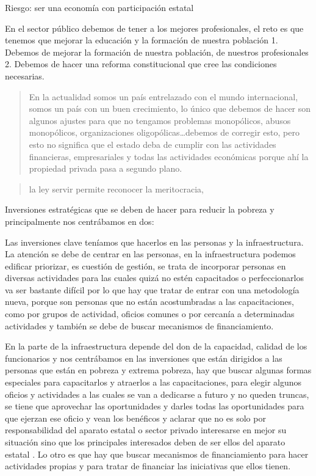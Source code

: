 \documentclass[
  a4paper,
]{article}
\begin{document}
Riesgo: ser una economía con participación estatal

En el sector público debemos de tener a los mejores profesionales, el
reto es que tenemos que mejorar la educación y la formación de nuestra
población 1. Debemos de mejorar la formación de nuestra población, de
nuestros profesionales 2. Debemos de hacer una reforma constitucional
que cree las condiciones necesarias.

\begin{quote}
En la actualidad somos un país entrelazado con el mundo internacional,
somos un país con un buen crecimiento, lo único que debemos de hacer son
algunos ajustes para que no tengamos problemas monopólicos, abusos
monopólicos, organizaciones oligopólicas\ldots debemos de corregir esto,
pero esto no significa que el estado deba de cumplir con las actividades
financieras, empresariales y todas las actividades económicas porque ahí
la propiedad privada pasa a segundo plano.
\end{quote}

\begin{quote}
la ley servir permite reconocer la meritocracia,
\end{quote}

Inversiones estratégicas que se deben de hacer para reducir la pobreza y
principalmente nos centrábamos en dos:

Las inversiones clave teníamos que hacerlos en las personas y la
infraestructura. La atención se debe de centrar en las personas, en la
infraestructura podemos edificar priorizar, es cuestión de gestión, se
trata de incorporar personas en diversas actividades para las cuales
quizá no estén capacitados o perfeccionarlos va ser bastante difícil por
lo que hay que tratar de entrar con una metodología nueva, porque son
personas que no están acostumbradas a las capacitaciones, como por
grupos de actividad, oficios comunes o por cercanía a determinadas
actividades y también se debe de buscar mecanismos de financiamiento.

En la parte de la infraestructura depende del don de la capacidad,
calidad de los funcionarios y nos centrábamos en las inversiones que
están dirigidos a las personas que están en pobreza y extrema pobreza,
hay que buscar algunas formas especiales para capacitarlos y atraerlos a
las capacitaciones, para elegir algunos oficios y actividades a las
cuales se van a dedicarse a futuro y no queden truncas, se tiene que
aprovechar las oportunidades y darles todas las oportunidades para que
ejerzan ese oficio y vean los benéficos y aclarar que no es solo por
responsabilidad del aparato estatal o sector privado interesarse en
mejor su situación sino que los principales interesados deben de ser
ellos del aparato estatal . Lo otro es que hay que buscar mecanismos de
financiamiento para hacer actividades propias y para tratar de financiar
las iniciativas que ellos tienen.
\end{document}

